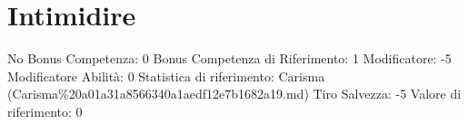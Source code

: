 \section{Intimidire}\label{intimidire}

\begin{description}
\tightlist
\item[Tags: ABI]
No Bonus Competenza: 0 Bonus Competenza di Riferimento: 1 Modificatore:
-5 Modificatore Abilità: 0 Statistica di riferimento: Carisma
(Carisma\%20a01a31a8566340a1aedf12e7b1682a19.md) Tiro Salvezza: -5
Valore di riferimento: 0
\end{description}
